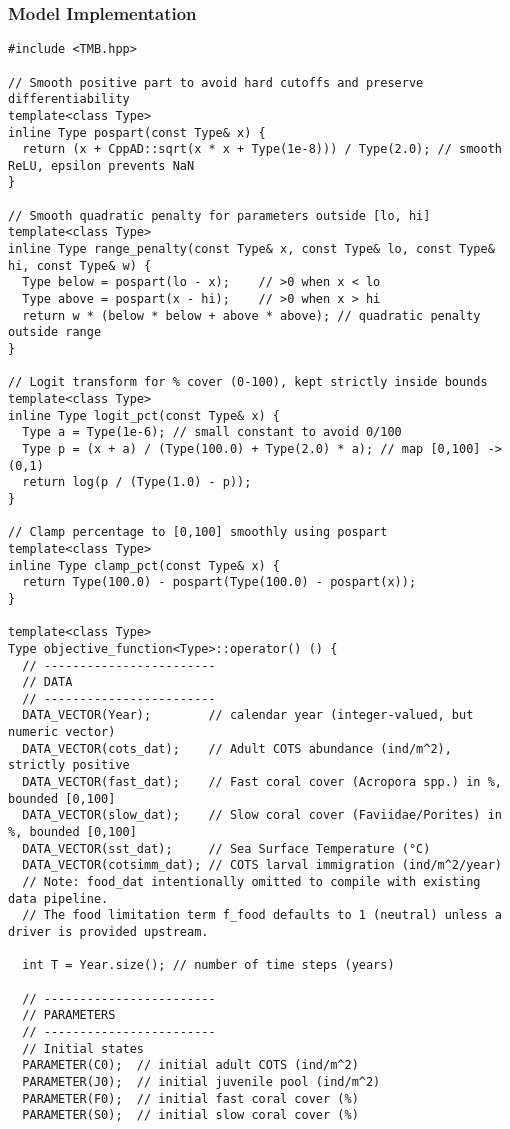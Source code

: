\subsubsection{Model Implementation}
\begin{lstlisting}
#include <TMB.hpp>

// Smooth positive part to avoid hard cutoffs and preserve differentiability
template<class Type>
inline Type pospart(const Type& x) {
  return (x + CppAD::sqrt(x * x + Type(1e-8))) / Type(2.0); // smooth ReLU, epsilon prevents NaN
}

// Smooth quadratic penalty for parameters outside [lo, hi]
template<class Type>
inline Type range_penalty(const Type& x, const Type& lo, const Type& hi, const Type& w) {
  Type below = pospart(lo - x);    // >0 when x < lo
  Type above = pospart(x - hi);    // >0 when x > hi
  return w * (below * below + above * above); // quadratic penalty outside range
}

// Logit transform for % cover (0-100), kept strictly inside bounds
template<class Type>
inline Type logit_pct(const Type& x) {
  Type a = Type(1e-6); // small constant to avoid 0/100
  Type p = (x + a) / (Type(100.0) + Type(2.0) * a); // map [0,100] -> (0,1)
  return log(p / (Type(1.0) - p));
}

// Clamp percentage to [0,100] smoothly using pospart
template<class Type>
inline Type clamp_pct(const Type& x) {
  return Type(100.0) - pospart(Type(100.0) - pospart(x));
}

template<class Type>
Type objective_function<Type>::operator() () {
  // ------------------------
  // DATA
  // ------------------------
  DATA_VECTOR(Year);        // calendar year (integer-valued, but numeric vector)
  DATA_VECTOR(cots_dat);    // Adult COTS abundance (ind/m^2), strictly positive
  DATA_VECTOR(fast_dat);    // Fast coral cover (Acropora spp.) in %, bounded [0,100]
  DATA_VECTOR(slow_dat);    // Slow coral cover (Faviidae/Porites) in %, bounded [0,100]
  DATA_VECTOR(sst_dat);     // Sea Surface Temperature (°C)
  DATA_VECTOR(cotsimm_dat); // COTS larval immigration (ind/m^2/year)
  // Note: food_dat intentionally omitted to compile with existing data pipeline.
  // The food limitation term f_food defaults to 1 (neutral) unless a driver is provided upstream.

  int T = Year.size(); // number of time steps (years)

  // ------------------------
  // PARAMETERS
  // ------------------------
  // Initial states
  PARAMETER(C0);  // initial adult COTS (ind/m^2)
  PARAMETER(J0);  // initial juvenile pool (ind/m^2)
  PARAMETER(F0);  // initial fast coral cover (%)
  PARAMETER(S0);  // initial slow coral cover (%)


\end{lstlisting}
